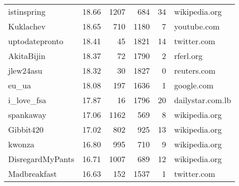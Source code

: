 \begin{tabular}{lrrrrl}
istinspring          &      18.66 &    1207 &      684 &         34 &      wikipedia.org \\
Kuklachev            &      18.65 &     710 &     1180 &          7 &        youtube.com \\
uptodatepronto       &      18.41 &      45 &     1821 &         14 &        twitter.com \\
AkitaBijin           &      18.37 &      72 &     1790 &          2 &           rferl.org \\
jlew24asu            &      18.32 &      30 &     1827 &          0 &         reuters.com \\
eu\_ua                &      18.08 &     197 &     1636 &          1 &         google.com \\
i\_love\_fsa           &      17.87 &      16 &     1796 &         20 &    dailystar.com.lb \\
spankaway            &      17.06 &    1162 &      569 &          8 &      wikipedia.org \\
Gibbit420            &      17.02 &     802 &      925 &         13 &      wikipedia.org \\
kwonza               &      16.80 &     995 &      710 &          9 &      wikipedia.org \\
DisregardMyPants     &      16.71 &    1007 &      689 &         12 &      wikipedia.org \\
Madbreakfast         &      16.63 &     152 &     1537 &          1 &        twitter.com \\
\bottomrule
\end{tabular}
